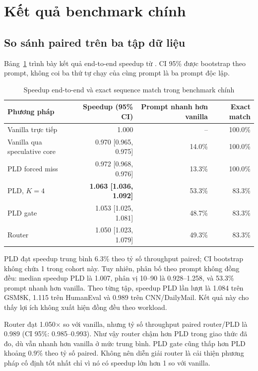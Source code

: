 \section{Kết quả benchmark chính}

\subsection{So sánh paired trên ba tập dữ liệu}
Bảng~\ref{tab:ch5-main-results} trình bày kết quả end-to-end speedup từ . CI 95\% được bootstrap theo prompt, không coi ba thứ tự chạy của cùng prompt là ba prompt độc lập.

\begin{table}[htbp]
\centering
\small
\caption{Speedup end-to-end và exact sequence match trong benchmark chính}
\label{tab:ch5-main-results}
\begin{tabularx}{\textwidth}{@{}Xrrr@{}}
\toprule
\textbf{Phương pháp} & \textbf{Speedup (95\% CI)} & \textbf{Prompt nhanh hơn vanilla} & \textbf{Exact match} \\
\midrule
Vanilla trực tiếp & 1.000 & -- & 100.0\% \\
Vanilla qua speculative core & 0.970 [0.965, 0.975] & 14.0\% & 100.0\% \\
PLD forced miss & 0.972 [0.968, 0.976] & 13.3\% & 100.0\% \\
PLD, \(K=4\) & \textbf{1.063 [1.036, 1.092]} & 53.3\% & 83.3\% \\
PLD gate & 1.053 [1.025, 1.081] & 48.7\% & 83.3\% \\
Router & 1.050 [1.023, 1.079] & 49.3\% & 83.3\% \\
\bottomrule
\end{tabularx}
\end{table}

PLD đạt speedup trung bình 6.3\% theo tỷ số throughput paired; CI bootstrap không chứa 1 trong cohort này. Tuy nhiên, phân bố theo prompt không đồng đều: median speedup PLD là 1.007, phân vị 10--90 là 0.928--1.258, và 53.3\% prompt nhanh hơn vanilla. Theo từng tập, speedup PLD lần lượt là 1.084 trên GSM8K, 1.115 trên HumanEval và 0.989 trên CNN/DailyMail. Kết quả này cho thấy lợi ích không xuất hiện đồng đều theo workload.

Router đạt 1.050\(\times\) so với vanilla, nhưng tỷ số throughput paired router/PLD là 0.989 (CI 95\%: 0.985--0.993). Như vậy router chậm hơn PLD trong giao thức đã đo, dù vẫn nhanh hơn vanilla ở mức trung bình. PLD gate cũng thấp hơn PLD khoảng 0.9\% theo tỷ số paired. Không nên diễn giải router là cải thiện phương pháp cố định tốt nhất chỉ vì nó có speedup lớn hơn 1 so với vanilla.

